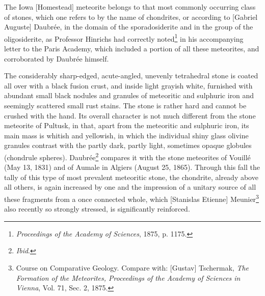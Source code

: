 \documentclass[a4paper, 12pt, oneside]{article}
\begin{document}
The Iowa [Homestead] meteorite belongs to that most commonly occurring class of stones, which one refers to by the name of chondrites, or according to [Gabriel Auguste] Daubrée, in the domain of the sporadosiderite and in the group of the oligosiderite, as Professor Hinrichs had correctly noted\footnote{\emph{Proceedings of the Academy of Sciences}, 1875, p. 1175.} in his accompanying letter to the Paris Academy, which included a portion of all these meteorites, and corroborated by Daubrée himself.

The considerably sharp-edged, acute-angled, unevenly tetrahedral stone is coated all over with a black fusion crust, and inside light grayish white, furnished with abundant small black nodules and granules of meteoritic and sulphuric iron and seemingly scattered small rust stains. The stone is rather hard and cannot be crushed with the hand. Its overall character is not much different from the stone meteorite of Pultusk, in that, apart from the meteoritic and sulphuric iron, its main mass is whitish and yellowish, in which the individual shiny glass olivine granules contrast with the partly dark, partly light, sometimes opaque globules (chondrule spheres). Daubrée\footnote{\emph{Ibid}.} compares it with the stone meteorites of Vouillé (May 13, 1831) and of Aumale in Algiers (August 25, 1865). Through this fall the tally of this type of most prevalent meteoritic stone, the chondrite, already above all others, is again increased by one and the impression of a unitary source of all these fragments from a once connected whole, which [Stanislas Etienne] Meunier\footnote{Course on Comparative Geology. Compare with: [Gustav] Tschermak, \emph{The Formation of the Meteorites, Proceedings of the Academy of Sciences in Vienna}, Vol. 71, Sec. 2, 1875.} also recently so strongly stressed, is significantly reinforced.
\end{document}
